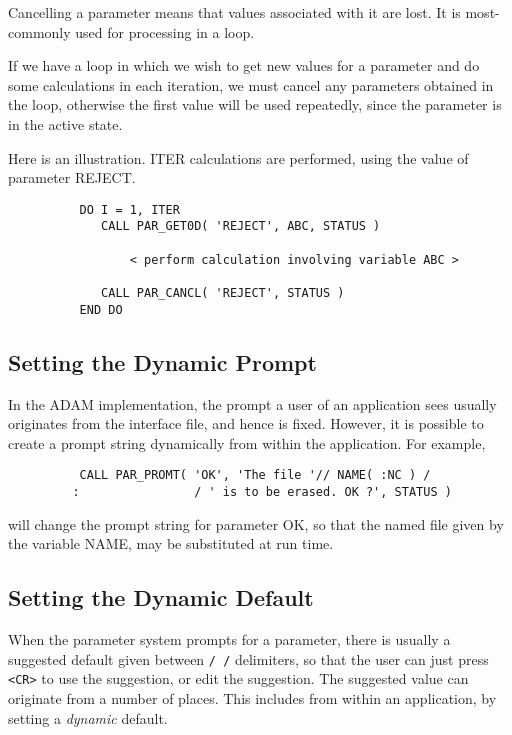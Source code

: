 \documentclass[twoside,11pt]{article}
\newcommand{\xlabel}[1]{}
\begin{document}
Cancelling a parameter means that values associated with it are lost.
It is most-commonly used for processing in a loop. 

If we have a loop in which we wish to get new values for a parameter and
do some calculations in each iteration, we must cancel any parameters
obtained in the loop, otherwise the first value will be used repeatedly,
since the parameter is in the active state.

Here is an illustration.  ITER calculations are performed, using
the value of parameter REJECT.

\begin{verbatim}
          DO I = 1, ITER
             CALL PAR_GET0D( 'REJECT', ABC, STATUS )

                 < perform calculation involving variable ABC >

             CALL PAR_CANCL( 'REJECT', STATUS )
          END DO
\end{verbatim}

\subsection{\xlabel{setting_the_dynamic_prompt}Setting the Dynamic Prompt}

In the ADAM implementation, the prompt a user of an application sees
usually originates from the interface file, and hence is fixed. 
However, it is possible to create a prompt string dynamically from
within the application. For example, 

\begin{verbatim}
          CALL PAR_PROMT( 'OK', 'The file '// NAME( :NC ) /
         :                / ' is to be erased. OK ?', STATUS )
\end{verbatim}

will change the prompt string for parameter OK, so that the named
file given by the variable NAME, may be substituted at run time. 

\subsection{\xlabel{setting_the_dynamic_default}Setting the Dynamic Default}

When the parameter system prompts for a parameter, there is usually a
suggested default given between {\tt / /} delimiters, so that the user
can just press {\tt <CR>} to use the suggestion, or edit the suggestion.
The suggested value can originate from a number of places.  This
includes from within an application, by setting a {\em dynamic\/}
default. 
\end{document}
